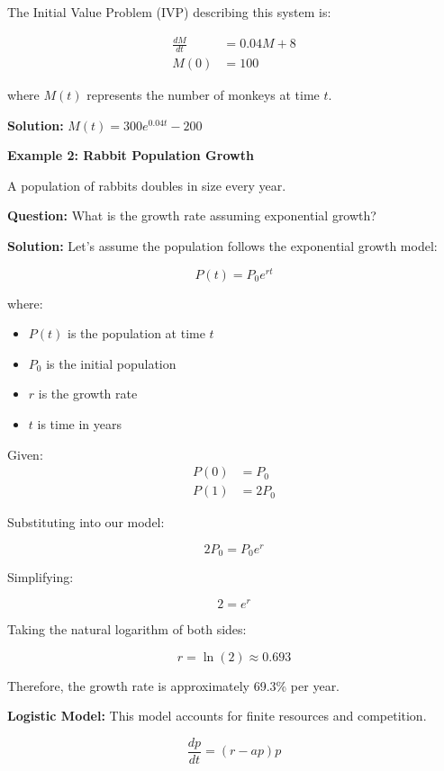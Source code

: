 \documentclass{article}
\begin{document}
The Initial Value Problem (IVP) describing this system is:

\begin{align*}
    \frac{dM}{dt} &= 0.04M + 8 \\
    M(0) &= 100
\end{align*}

where $M(t)$ represents the number of monkeys at time $t$.

\textbf{Solution:} $M(t) = 300e^{0.04t} - 200$

\vspace{0.5cm}

\textbf{Example 2: Rabbit Population Growth}

A population of rabbits doubles in size every year.

\textbf{Question:} What is the growth rate assuming exponential growth?

\textbf{Solution:}
Let's assume the population follows the exponential growth model:

\[P(t) = P_0e^{rt}\]

where:
\begin{itemize}
    \item $P(t)$ is the population at time $t$
    \item $P_0$ is the initial population
    \item $r$ is the growth rate
    \item $t$ is time in years
\end{itemize}

Given:
\begin{align*}
    P(0) &= P_0 \\
    P(1) &= 2P_0
\end{align*}

Substituting into our model:

\[2P_0 = P_0e^r\]

Simplifying:

\[2 = e^r\]

Taking the natural logarithm of both sides:

\[r = \ln(2) \approx 0.693\]

Therefore, the growth rate is approximately 69.3\% per year.

\textbf{Logistic Model:} This model accounts for finite resources and competition.

\begin{equation}
    \frac{dp}{dt} = (r-ap)p
\end{equation}
\end{document}
